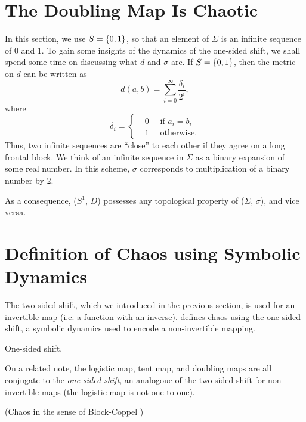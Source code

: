 \documentclass[10pt,twoside]{book}
\begin{document}
\section{The Doubling Map Is Chaotic}
In this section, we use $S = \left \{ 0,1 \right \}$, so that an element of $\Sigma$ is an infinite sequence of 0 and 1.
To gain some insights of the dynamics of the one-sided shift, we shall spend some time on discussing what $d$ and $\sigma$ are.
If $S = \left \{ 0,1 \right \}$, then the metric on $d$ can be written as
\begin{equation*}
  d(a,b) = \sum\limits_{i = 0}^{\infty} \frac{\delta_{i}}{2^i},
\end{equation*}
where
\begin{equation*}
  \delta_i = 
  \begin{cases}
    &0 \quad \mbox{ if } a_i = b_i  \\
    &1 \quad \mbox{ otherwise.}
  \end{cases}
\end{equation*}
Thus, two infinite sequences are ``close'' to each other if they agree on a long frontal block.
We think of an infinite sequence in $\Sigma$ as a binary expansion of some real number.
In this scheme, $\sigma$ corresponds to multiplication of a binary number by $2$.

As a consequence, ($S^1 $, $D$) possesses any topological property of ($\Sigma$, $\sigma$), and vice versa.


\section{Definition of Chaos using Symbolic Dynamics}
The two-sided shift, which we introduced in the previous section, is used for an invertible map (i.e. a function with an inverse).
\citet{blockcoppel} defines chaos using the one-sided shift, a symbolic dynamics used to encode a non-invertible mapping.
\begin{definition}
  One-sided shift.
\end{definition}
On a related note, the logistic map, tent map, and doubling maps are all conjugate to the \textit{one-sided shift}, an analogoue of the two-sided shift for non-invertible maps (the logistic map is not one-to-one).
\begin{definition}
  (Chaos in the sense of Block-Coppel \citep{blockcoppel})
  \label{defn:blockcoppel}
\end{definition}





\printindex
\end{document}

